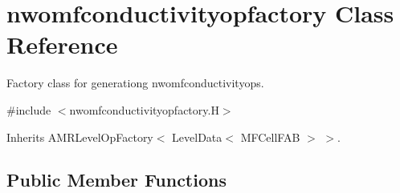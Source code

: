 \hypertarget{classnwomfconductivityopfactory}{}\section{nwomfconductivityopfactory Class Reference}
\label{classnwomfconductivityopfactory}


Factory class for generationg nwomfconductivityop\textquotesingle{}s.  




{\ttfamily \#include $<$nwomfconductivityopfactory.\+H$>$}



Inherits A\+M\+R\+Level\+Op\+Factory$<$ Level\+Data$<$ M\+F\+Cell\+F\+A\+B $>$ $>$.

\subsection*{Public Member Functions}
